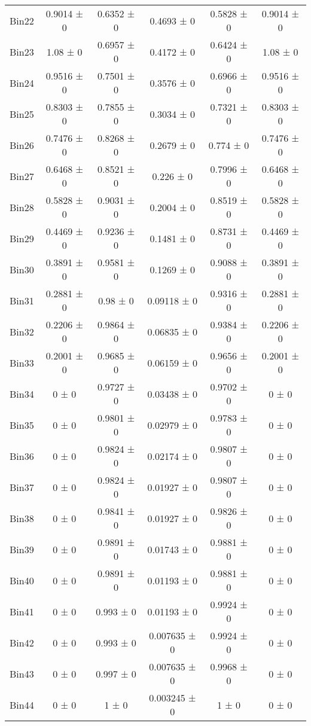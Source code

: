 \begin{tabular}{@{\extracolsep{4pt}}lccccc@{}}
     Bin22 & 0.9014 ± 0 & 0.6352 ± 0 & 0.4693 ± 0 & 0.5828 ± 0 & 0.9014 ± 0 \\ 
     Bin23 & 1.08 ± 0 & 0.6957 ± 0 & 0.4172 ± 0 & 0.6424 ± 0 & 1.08 ± 0 \\ 
     Bin24 & 0.9516 ± 0 & 0.7501 ± 0 & 0.3576 ± 0 & 0.6966 ± 0 & 0.9516 ± 0 \\ 
     Bin25 & 0.8303 ± 0 & 0.7855 ± 0 & 0.3034 ± 0 & 0.7321 ± 0 & 0.8303 ± 0 \\ 
     Bin26 & 0.7476 ± 0 & 0.8268 ± 0 & 0.2679 ± 0 & 0.774 ± 0 & 0.7476 ± 0 \\ 
     Bin27 & 0.6468 ± 0 & 0.8521 ± 0 & 0.226 ± 0 & 0.7996 ± 0 & 0.6468 ± 0 \\ 
     Bin28 & 0.5828 ± 0 & 0.9031 ± 0 & 0.2004 ± 0 & 0.8519 ± 0 & 0.5828 ± 0 \\ 
     Bin29 & 0.4469 ± 0 & 0.9236 ± 0 & 0.1481 ± 0 & 0.8731 ± 0 & 0.4469 ± 0 \\ 
     Bin30 & 0.3891 ± 0 & 0.9581 ± 0 & 0.1269 ± 0 & 0.9088 ± 0 & 0.3891 ± 0 \\ 
     Bin31 & 0.2881 ± 0 & 0.98 ± 0 & 0.09118 ± 0 & 0.9316 ± 0 & 0.2881 ± 0 \\ 
     Bin32 & 0.2206 ± 0 & 0.9864 ± 0 & 0.06835 ± 0 & 0.9384 ± 0 & 0.2206 ± 0 \\ 
     Bin33 & 0.2001 ± 0 & 0.9685 ± 0 & 0.06159 ± 0 & 0.9656 ± 0 & 0.2001 ± 0 \\ 
     Bin34 & 0 ± 0 & 0.9727 ± 0 & 0.03438 ± 0 & 0.9702 ± 0 & 0 ± 0 \\ 
     Bin35 & 0 ± 0 & 0.9801 ± 0 & 0.02979 ± 0 & 0.9783 ± 0 & 0 ± 0 \\ 
     Bin36 & 0 ± 0 & 0.9824 ± 0 & 0.02174 ± 0 & 0.9807 ± 0 & 0 ± 0 \\ 
     Bin37 & 0 ± 0 & 0.9824 ± 0 & 0.01927 ± 0 & 0.9807 ± 0 & 0 ± 0 \\ 
     Bin38 & 0 ± 0 & 0.9841 ± 0 & 0.01927 ± 0 & 0.9826 ± 0 & 0 ± 0 \\ 
     Bin39 & 0 ± 0 & 0.9891 ± 0 & 0.01743 ± 0 & 0.9881 ± 0 & 0 ± 0 \\ 
     Bin40 & 0 ± 0 & 0.9891 ± 0 & 0.01193 ± 0 & 0.9881 ± 0 & 0 ± 0 \\ 
     Bin41 & 0 ± 0 & 0.993 ± 0 & 0.01193 ± 0 & 0.9924 ± 0 & 0 ± 0 \\ 
     Bin42 & 0 ± 0 & 0.993 ± 0 & 0.007635 ± 0 & 0.9924 ± 0 & 0 ± 0 \\ 
     Bin43 & 0 ± 0 & 0.997 ± 0 & 0.007635 ± 0 & 0.9968 ± 0 & 0 ± 0 \\ 
     Bin44 & 0 ± 0 & 1 ± 0 & 0.003245 ± 0 & 1 ± 0 & 0 ± 0 \\ 

\end{tabular}
